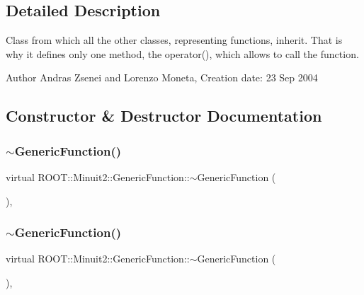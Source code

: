 \subsection{Detailed Description}
Class from which all the other classes, representing functions, inherit. That is why it defines only one method, the operator(), which allows to call the function.

\begin{DoxyAuthor}{Author}
Andras Zsenei and Lorenzo Moneta, Creation date\+: 23 Sep 2004 
\end{DoxyAuthor}


\subsection{Constructor \& Destructor Documentation}
\mbox{\label{classROOT_1_1Minuit2_1_1GenericFunction_ac1d198b822e43d3936286cc580c3e035}} 
\subsubsection{\texorpdfstring{$\sim$GenericFunction()}{~GenericFunction()}\hspace{0.1cm}{\footnotesize\ttfamily [1/3]}}
{\footnotesize\ttfamily virtual R\+O\+O\+T\+::\+Minuit2\+::\+Generic\+Function\+::$\sim$\+Generic\+Function (\begin{DoxyParamCaption}{ }\end{DoxyParamCaption})\hspace{0.3cm}{\ttfamily [inline]}, {\ttfamily [virtual]}}

\mbox{\label{classROOT_1_1Minuit2_1_1GenericFunction_ac1d198b822e43d3936286cc580c3e035}} 
\subsubsection{\texorpdfstring{$\sim$GenericFunction()}{~GenericFunction()}\hspace{0.1cm}{\footnotesize\ttfamily [2/3]}}
{\footnotesize\ttfamily virtual R\+O\+O\+T\+::\+Minuit2\+::\+Generic\+Function\+::$\sim$\+Generic\+Function (\begin{DoxyParamCaption}{ }\end{DoxyParamCaption})\hspace{0.3cm}{\ttfamily [inline]}, {\ttfamily [virtual]}}

